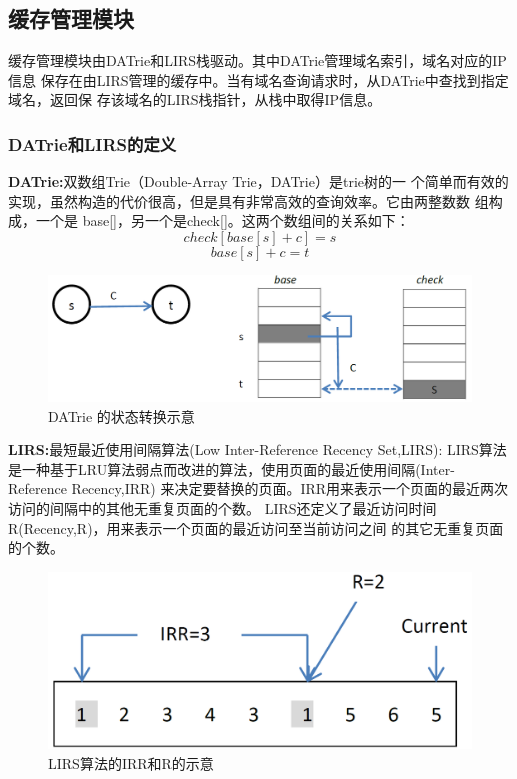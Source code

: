 \subsection{缓存管理模块} 

缓存管理模块由DATrie和LIRS栈驱动。其中DATrie管理域名索引，域名对应的IP信息
保存在由LIRS管理的缓存中。当有域名查询请求时，从DATrie中查找到指定域名，返回保
存该域名的LIRS栈指针，从栈中取得IP信息。
\subsubsection{DATrie和LIRS的定义}
\noindent \textbf{DATrie:}双数组Trie（Double-Array Trie，DATrie）是trie树的一
个简单而有效的实现，虽然构造的代价很高，但是具有非常高效的查询效率。它由两整数数
组构成，一个是 base[]，另一个是check[]。这两个数组间的关系如下：$$check[base[s] + c] = s$$
$$base[s]+ c = t$$


\begin{figure}[H]
\centering
\includegraphics[keepaspectratio, scale=0.4]{pitures/aaa.png}
\caption{ DATrie 的状态转换示意} 
\end{figure}

\noindent \textbf{LIRS:}最短最近使用间隔算法(Low Inter-Reference Recency Set,LIRS): LIRS算法
	是一种基于LRU算法弱点而改进的算法，使用页面的最近使用间隔(Inter-Reference Recency,IRR)
	来决定要替换的页面。IRR用来表示一个页面的最近两次访问的间隔中的其他无重复页面的个数。
	LIRS还定义了最近访问时间R(Recency,R)，用来表示一个页面的最近访问至当前访问之间
	的其它无重复页面的个数。


\begin{figure}[H]
\centering
\includegraphics[keepaspectratio, scale=0.4]{pitures/irr.png}
\caption{LIRS算法的IRR和R的示意} 
\end{figure}

